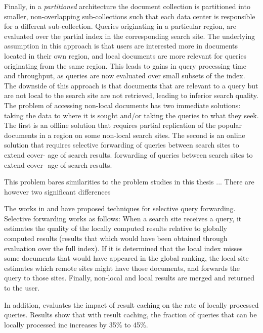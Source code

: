 Finally, in a \textit{partitioned} architecture the document collection is partitioned into smaller, non-overlapping
sub-collections such that each data center is responsible for a different sub-collection.
Queries originating in a particular region, are evaluated over the partial index in the corresponding search site.
The underlying assumption in this approach is that users are interested more in documents located in their own region,
and local documents are more relevant for queries originating from the same region.
This leads to gains in query processing time and throughput, as queries are now evaluated over small subsets of
the index.
The downside of this approach is that documents that are relevant to a query but are not local to the search site are
not retrieved, leading to inferior search quality.
The problem of accessing non-local documents has two immediate solutions:
taking the data to where it is sought and/or taking the queries to what they seek.
The first is an offline solution that requires partial replication of the popular documents in a region on some non-local search sites.
The second is an online solution that requires selective forwarding of queries between search sites to extend cover- age of search results.
forwarding of queries between search sites to extend cover- age of search results.

This problem bares similarities to the problem studies in this thesis ...
There are however two significant differences

\medskip
\noindent
The works in \cite{yates:multisitefeasibility} and \cite{cambazoglu:multisiteforwarding}
have proposed techniques for selective query forwarding.
Selective forwarding works as follows:
When a search site receives a query, it estimates the quality of the locally computed results relative to globally computed results
(results that which would have been obtained through evaluation over the full index).
If it is determined that the local index misses some documents that would have appeared in the global ranking,
the local site estimates which remote sites might have those documents, and forwards the query to those sites.
Finally, non-local and local results are merged and returned to the user.

In addition, \cite{cambazoglu:multisiteforwarding} evaluates the impact of result caching
on the rate of locally processed queries.
Results show that with result caching, the fraction of queries that can be locally processed inc increases by 35\% to 45\%.

